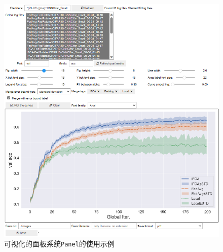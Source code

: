 \begin{figure}[ht]
    \centering
    \includegraphics[width=\textwidth]{figures/panel-in-use.png}
    \caption{可视化的面板系统\texttt{Panel}的使用示例}
    \label{fig:panel-in-use}
\end{figure}

